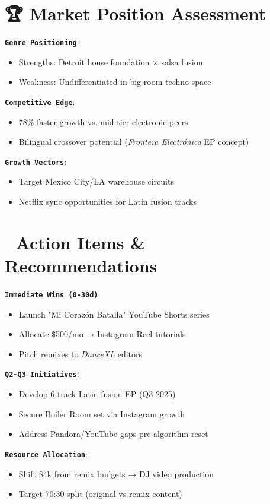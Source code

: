 \documentclass{article}
\begin{document}
\section*{\normalsize 🏆 Market Position Assessment}  
\texttt{\textbf{Genre Positioning}}:  
\begin{itemize}  
\item Strengths: Detroit house foundation × salsa fusion  
\item Weakness: Undifferentiated in big-room techno space  
\end{itemize}  

\texttt{\textbf{Competitive Edge}}:  
\begin{itemize}  
\item 78\% faster growth vs. mid-tier electronic peers  
\item Bilingual crossover potential (\textit{Frontera Electrónica} EP concept)  
\end{itemize}  

\texttt{\textbf{Growth Vectors}}:  
\begin{itemize}  
\item Target Mexico City/LA warehouse circuits  
\item Netflix sync opportunities for Latin fusion tracks  
\end{itemize}  

\section*{\normalsize 🚀 Action Items \& Recommendations}  
\texttt{\textbf{Immediate Wins (0-30d)}}:  
\begin{itemize}  
\item Launch "Mi Corazón Batalla" YouTube Shorts series  
\item Allocate \$500/mo → Instagram Reel tutorials  
\item Pitch remixes to \textit{DanceXL} editors  
\end{itemize}  

\texttt{\textbf{Q2-Q3 Initiatives}}:  
\begin{itemize}  
\item Develop 6-track Latin fusion EP (Q3 2025)  
\item Secure Boiler Room set via Instagram growth  
\item Address Pandora/YouTube gaps pre-algorithm reset  
\end{itemize}  

\texttt{\textbf{Resource Allocation}}:  
\begin{itemize}  
\item Shift \$4k from remix budgets → DJ video production  
\item Target 70:30 split (original vs remix content)  
\end{itemize}  
\end{document}
